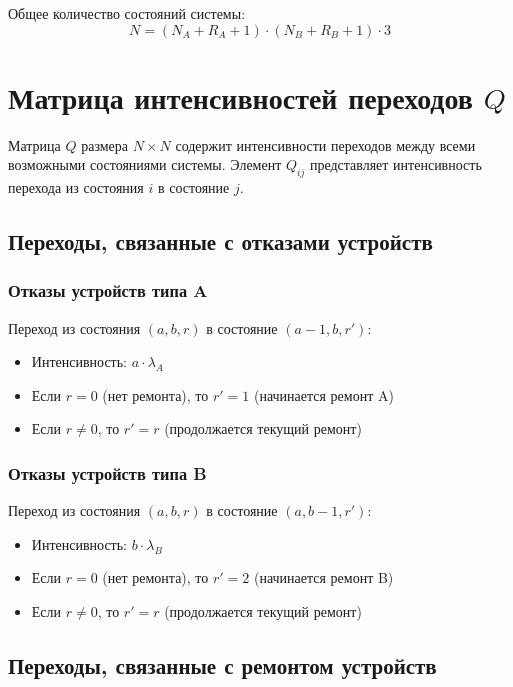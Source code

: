 Общее количество состояний системы:
\begin{equation}
    N = (N_A + R_A + 1) \cdot (N_B + R_B + 1) \cdot 3
\end{equation}

\section{Матрица интенсивностей переходов $Q$}

Матрица $Q$ размера $N \times N$ содержит интенсивности переходов между всеми возможными состояниями системы. Элемент $Q_{ij}$ представляет интенсивность перехода из состояния $i$ в состояние $j$.

\subsection{Переходы, связанные с отказами устройств}

\subsubsection{Отказы устройств типа A}

Переход из состояния $(a, b, r)$ в состояние $(a-1, b, r')$:
\begin{itemize}
    \item Интенсивность: $a \cdot \lambda_A$
    \item Если $r = 0$ (нет ремонта), то $r' = 1$ (начинается ремонт A)
    \item Если $r \neq 0$, то $r' = r$ (продолжается текущий ремонт)
\end{itemize}

\subsubsection{Отказы устройств типа B}

Переход из состояния $(a, b, r)$ в состояние $(a, b-1, r')$:
\begin{itemize}
    \item Интенсивность: $b \cdot \lambda_B$
    \item Если $r = 0$ (нет ремонта), то $r' = 2$ (начинается ремонт B)
    \item Если $r \neq 0$, то $r' = r$ (продолжается текущий ремонт)
\end{itemize}

\subsection{Переходы, связанные с ремонтом устройств}

